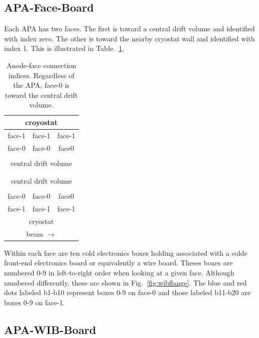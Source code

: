 \documentclass[pdftex,12pt,letter]{article}
\begin{document}
\subsection{APA-Face-Board}

Each APA has two faces.  The first is toward a central drift volume
and identified with index zero.  The other is toward the nearby
cryostat wall and identified with index 1.  This is illustrated in
Table.~\ref{tab:anodeface}.

\begin{table}[htp]
  \label{tab:anodeface}
  \centering
  \begin{tabular}[h]{|c|c|c|}
    \hline
    \hline
    \multicolumn{3}{|c|}{croyostat}\\
    \hline
    face-1 & face-1 & face-1 \\
    \hline
    \hline
    face-0 & face-0 & face0 \\
    \hline
    \multicolumn{3}{|c|}{}\\
    \multicolumn{3}{|c|}{central drift volume}\\
    \multicolumn{3}{|c|}{}\\
    \hline
    \hline
    \hline
    \multicolumn{3}{|c|}{}\\
    \multicolumn{3}{|c|}{central drift volume}\\
    \multicolumn{3}{|c|}{}\\
    \hline
    face-0 & face-0 & face0 \\
    \hline
    \hline
    face-1 & face-1 & face-1 \\
    \hline
    \multicolumn{3}{|c|}{cryostat}\\
    \hline
    \hline
    \multicolumn{3}{c}{beam $\longrightarrow$} \\    

  \end{tabular}
  \caption{Anode-face connection indices.  Regardless of the APA, face-0 is toward the central drift volume.}
\end{table}

Within each face are ten cold electronics boxes holding associated
with a colde front-end electronics board or equivalently a wire board.
Theses boxes are numbered 0-9 in left-to-right order when looking at a
given face.  Although numbered differently, these are shown in
Fig.~\ref{fig:wibflange}.  The blue and red dots labeled b1-b10
represent boxes 0-9 on face-0 and those labeled b11-b20 are boxes 0-9
on face-1.

\subsection{APA-WIB-Board}
\end{document}
